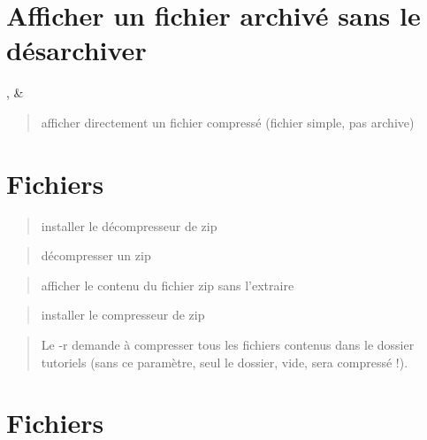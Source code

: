 \documentclass[letterpaper,10pt,french]{sphinxmanual}
\begin{document}
\section{Afficher un fichier archivé sans le désarchiver}
\label{\detokenize{15-archiver:afficher-un-fichier-archive-sans-le-desarchiver}}
,  \& 
\begin{quote}

afficher directement un fichier compressé (fichier simple, pas archive)
\end{quote}


\section{Fichiers }
\label{\detokenize{15-archiver:fichiers-zip}}
\begin{quote}

installer le décompresseur de zip
\end{quote}

\begin{quote}

décompresser un zip
\end{quote}

\begin{quote}

afficher le contenu du fichier zip sans l’extraire
\end{quote}

\begin{quote}

installer le compresseur de zip
\end{quote}

\begin{quote}

Le -r demande à compresser tous les fichiers contenus dans le dossier tutoriels (sans ce paramètre, seul le dossier, vide, sera compressé !).
\end{quote}


\section{Fichiers }
\label{\detokenize{15-archiver:fichiers-rar}}
\end{document}
